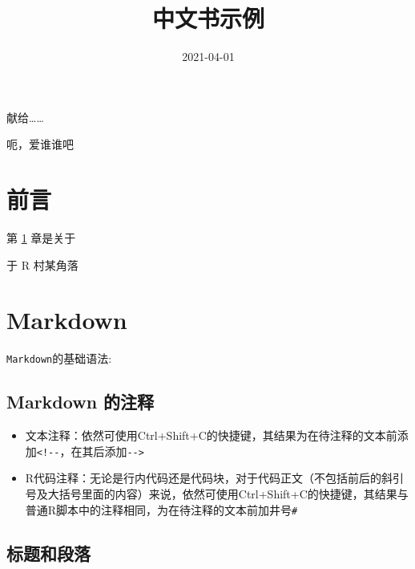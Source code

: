 \documentclass[]{ctexbook}
\title{中文书示例}
\date{2021-04-01}
\providecommand{\tightlist}{%
  \setlength{\itemsep}{0pt}\setlength{\parskip}{0pt}}
\begin{document}
\maketitle


\thispagestyle{empty}

\begin{center}
献给……

呃，爱谁谁吧
\end{center}

\setlength{\abovedisplayskip}{-5pt}
\setlength{\abovedisplayshortskip}{-5pt}

{
\setcounter{tocdepth}{2}
\tableofcontents
}
\listoftables
\listoffigures
\hypertarget{ux524dux8a00}{%
\chapter*{前言}\label{ux524dux8a00}}


第 \ref{markdown} 章是关于

\begin{flushright}
于 R 村某角落
\end{flushright}

\hypertarget{markdown}{%
\chapter{Markdown}\label{markdown}}

\texttt{Markdown}的基础语法:

\hypertarget{comment}{%
\section{Markdown 的注释}\label{comment}}

\begin{itemize}
\tightlist
\item
  文本注释：依然可使用Ctrl+Shift+C的快捷键，其结果为在待注释的文本前添加\texttt{\textless{}!-\/-}，在其后添加\texttt{-\/-\textgreater{}}
\item
  R代码注释：无论是行内代码还是代码块，对于代码正文（不包括前后的斜引号及大括号里面的内容）来说，依然可使用Ctrl+Shift+C的快捷键，其结果与普通R脚本中的注释相同，为在待注释的文本前加井号\texttt{\#}
\end{itemize}

\hypertarget{ux6807ux9898ux548cux6bb5ux843d}{%
\section{标题和段落}\label{ux6807ux9898ux548cux6bb5ux843d}}
\end{document}
